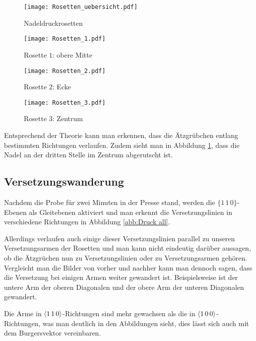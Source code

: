 \documentclass[12pt,a4paper]{scrartcl}
\numberwithin{equation}{section} %
\renewcommand{\[}{} %
\renewcommand{\]}{\noindent} %
\begin{document}
\begin{figure}[ht]
	\begin{minipage}[t]{.5\linewidth}
		\texttt{[image: Rosetten\_uebersicht.pdf]}
		\caption{Nadeldruckrosetten}
		\label{abb:Rosetten all}
	\end{minipage}
	\begin{minipage}[t]{.5\linewidth}
		\texttt{[image: Rosetten\_1.pdf]}
		\caption{Rosette $1$: obere Mitte }
		\label{abb:Rosetten 1}
	\end{minipage}
	
	\vspace{8pt}
	\begin{minipage}[t]{.5\linewidth}
		\texttt{[image: Rosetten\_2.pdf]}
		\caption{Rosette $2$: Ecke}
		\label{abb:Rosetten 2}
	\end{minipage}
	\begin{minipage}[t]{.5\linewidth}
	\texttt{[image: Rosetten\_3.pdf]}
	\caption{Rosette $3$: Zentrum}
	\label{abb:Rosetten 3}
\end{minipage}
\end{figure}

Entsprechend der Theorie kann man erkennen, dass die Ätzgrübchen entlang bestimmten Richtungen verlaufen. Zudem sieht man in Abbildung \ref{abb:Rosetten 3}, dass die Nadel an der dritten Stelle im Zentrum abgerutscht ist.

\hypertarget{versetzungswanderung}{%
\subsection{Versetzungswanderung}\label{versetzungswanderung}}

Nachdem die Probe für zwei Minuten in der Presse stand, werden die
\(\lbrace1\,1\,0\rbrace\)-Ebenen als Gleitebenen aktiviert und man
erkennt die Versetzungslinien in verschiedene Richtungen in Abbildung \ref{abb:Druck all}.

Allerdings verlaufen auch einige dieser Versetzungslinien parallel zu
unseren Versetzungsarmen der Rosetten und man kann nicht eindeutig
darüber aussagen, ob die Ätzgrüchen nun zu Versetzungslinien oder zu
Versetzungsarmen gehören. Vergleicht man die Bilder von vorher und
nachher kann man dennoch sagen, dass die Versetzung bei einigen Armen
weiter gewandert ist. Beispielsweise ist der untere Arm der oberen
Diagonalen und der obere Arm der unteren Diagonalen gewandert.

Die Arme in \(\expval{1\,1\,0}\)-Richtungen sind mehr gewachsen als die
in \(\expval{1\,0\,0}\)-Richtungen, was man deutlich in den Abbildungen
sieht, dies lässt sich auch mit dem Burgersvektor vereinbaren.
\end{document}
